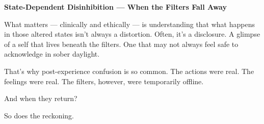 \begin{TechnicalSidebar}{\textbf{State-Dependent Disinhibition — When the Filters Fall Away}}
  \medskip

  What matters — clinically and ethically — is understanding that what happens in those altered 
  states isn’t always a distortion. Often, it’s a disclosure. A glimpse of a self that lives beneath 
  the filters. One that may not always feel safe to acknowledge in sober daylight.

  \medskip
  
  That’s why post-experience confusion is so common. The actions were real. The feelings were real. 
  The filters, however, were temporarily offline.

  \medskip
  
  And when they return?

  \medskip
  
  So does the reckoning.
  
\end{TechnicalSidebar}
